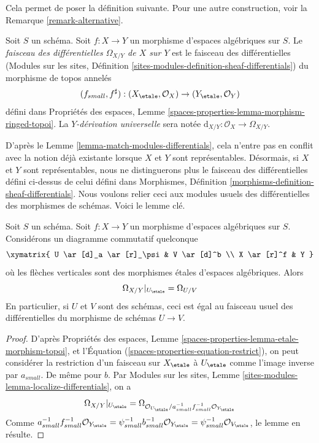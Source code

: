 \noindent
Cela permet de poser la définition suivante. Pour une autre construction, voir la
Remarque \ref{remark-alternative}.

\begin{definition}
\label{definition-sheaf-differentials}
Soit $S$ un schéma. Soit $f : X \to Y$ un morphisme d'espaces algébriques
sur $S$. Le {\it faisceau des différentielles $\Omega_{X/Y}$ de $X$ sur $Y$}
est le faisceau des différentielles
(Modules sur les sites,
Définition \ref{sites-modules-definition-sheaf-differentials})
du morphisme de topos annelés
$$
(f_{small}, f^\sharp) :
(X_\etale, \mathcal{O}_X)
\to
(Y_\etale, \mathcal{O}_Y)
$$
défini dans
Propriétés des espaces,
Lemme \ref{spaces-properties-lemma-morphism-ringed-topoi}.
La {\it $Y$-dérivation universelle} sera notée
$\text{d}_{X/Y} : \mathcal{O}_X \to \Omega_{X/Y}$.
\end{definition}

\noindent
D'après le
Lemme \ref{lemma-match-modules-differentials},
cela n'entre pas en conflit avec la notion déjà existante
lorsque $X$ et $Y$ sont représentables. Désormais, si $X$ et $Y$
sont représentables, nous ne distinguerons plus le faisceau des différentielles
défini ci-dessus de celui défini dans
Morphismes, Définition \ref{morphisms-definition-sheaf-differentials}.
Nous voulons relier ceci aux modules usuels des différentielles des
morphismes de schémas. Voici le lemme clé.

\begin{lemma}
\label{lemma-localize-differentials}
Soit $S$ un schéma. Soit $f : X \to Y$ un morphisme d'espaces algébriques
sur $S$. Considérons un diagramme commutatif quelconque
$$
\xymatrix{
U \ar[d]_a \ar[r]_\psi & V \ar[d]^b \\
X \ar[r]^f & Y
}
$$
où les flèches verticales sont des morphismes étales d'espaces algébriques. Alors
$$
\Omega_{X/Y}|_{U_\etale} = \Omega_{U/V}
$$
En particulier, si $U$ et $V$ sont des schémas, ceci est égal au faisceau usuel
des différentielles du morphisme de schémas $U \to V$.
\end{lemma}

\begin{proof}
D'après
Propriétés des espaces, Lemme \ref{spaces-properties-lemma-etale-morphism-topoi},
et l'Équation (\ref{spaces-properties-equation-restrict}),
on peut considérer la restriction d'un faisceau sur $X_\etale$ à
$U_\etale$ comme l'image inverse par $a_{small}$. De même pour $b$. Par
Modules sur les sites, Lemme \ref{sites-modules-lemma-localize-differentials},
on a
$$
\Omega_{X/Y}|_{U_\etale} =
\Omega_{\mathcal{O}_{U_\etale}/
a_{small}^{-1}f_{small}^{-1}\mathcal{O}_{Y_\etale}}
$$
Comme $a_{small}^{-1}f_{small}^{-1}\mathcal{O}_{Y_\etale}
= \psi_{small}^{-1}b_{small}^{-1}\mathcal{O}_{Y_\etale}
= \psi_{small}^{-1}\mathcal{O}_{V_\etale}$, le lemme en résulte.
\end{proof}

